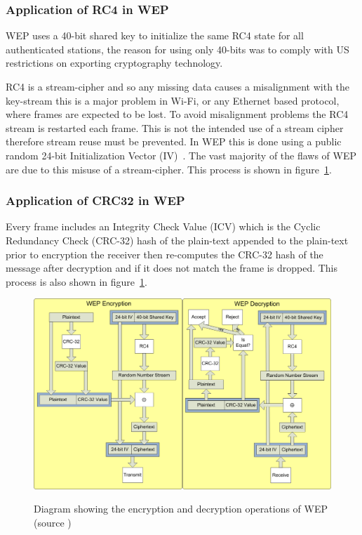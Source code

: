 \documentclass[pdftex, 12pt, a4paper]{article}
\begin{document}
\subsubsection{Application of RC4 in WEP}
WEP uses a 40-bit shared key to initialize the same RC4 state for all authenticated stations, the reason for using only 40-bits was to comply with US restrictions on exporting cryptography technology\cite{wep-evolution}.

RC4 is a stream-cipher and so any missing data causes a misalignment with the key-stream this is a major problem in Wi-Fi, or any Ethernet based protocol, where frames are expected to be lost.
To avoid misalignment problems the RC4 stream is restarted each frame. This is not the intended use of a stream cipher therefore stream reuse must be prevented. In WEP this is done using a public random 24-bit Initialization Vector (IV)~\label{p:iv}.  The vast majority of the flaws of WEP are due to this misuse of a stream-cipher. This process is shown in figure~\ref{fig:wepop}.

\subsubsection{Application of CRC32 in WEP}
Every frame includes an Integrity Check Value (ICV) which is the Cyclic Redundancy Check (CRC-32) hash of the plain-text appended to the plain-text prior to encryption the receiver then re-computes the CRC-32 hash of the message after decryption and if it does not match the frame is dropped. This process is also shown in figure~\ref{fig:wepop}.

\begin{figure}[htb]
\center
\includegraphics[width=0.9\linewidth]{img/wepOperation}\label{fig:wepop}
\caption{Diagram showing the encryption and decryption operations of WEP (source \protect\cite{wep-evolution})}
\end{figure}
\end{document}
